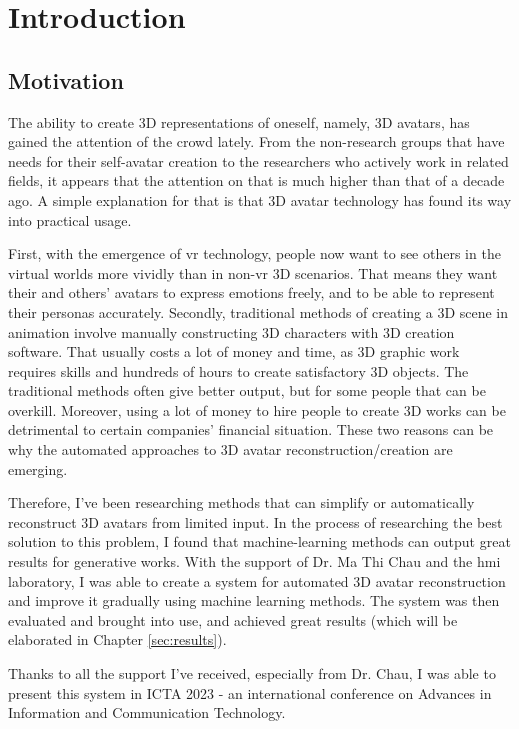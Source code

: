 \section{Introduction}
\label{sec:intro}

\subsection{Motivation}
\label{sec:intro/motivation}
The ability to create 3D representations of oneself, namely, 3D avatars, has gained the attention of the crowd lately. From the non-research groups that have needs for their self-avatar creation to the researchers who actively work in related fields, it appears that the attention on that is much higher than that of a decade ago. A simple explanation for that is that 3D avatar technology has found its way into practical usage.


First, with the emergence of \gls{vr} technology, people now want to see others in the virtual worlds more vividly than in non-\gls{vr} 3D scenarios. That means they want their and others' avatars to express emotions freely, and to be able to represent their personas accurately. Secondly, traditional methods of creating a 3D scene in animation involve manually constructing 3D characters with 3D creation software. That usually costs a lot of money and time, as 3D graphic work requires skills and hundreds of hours to create satisfactory 3D objects. The traditional methods often give better output, but for some people that can be overkill. Moreover, using a lot of money to hire people to create 3D works can be detrimental to certain companies' financial situation. These two reasons can be why the automated approaches to 3D avatar reconstruction/creation are emerging.


Therefore, I've been researching methods that can simplify or automatically reconstruct 3D avatars from limited input. In the process of researching the best solution to this problem, I found that machine-learning methods can output great results for generative works. With the support of Dr. Ma Thi Chau and the \gls{hmi} laboratory, I was able to create a system for automated 3D avatar reconstruction and improve it gradually using machine learning methods. The system was then evaluated and brought into use, and achieved great results (which will be elaborated in Chapter \ref{sec:results}).


Thanks to all the support I've received, especially from Dr. Chau, I was able to present this system in ICTA 2023 - an international conference on Advances in Information and Communication Technology.

